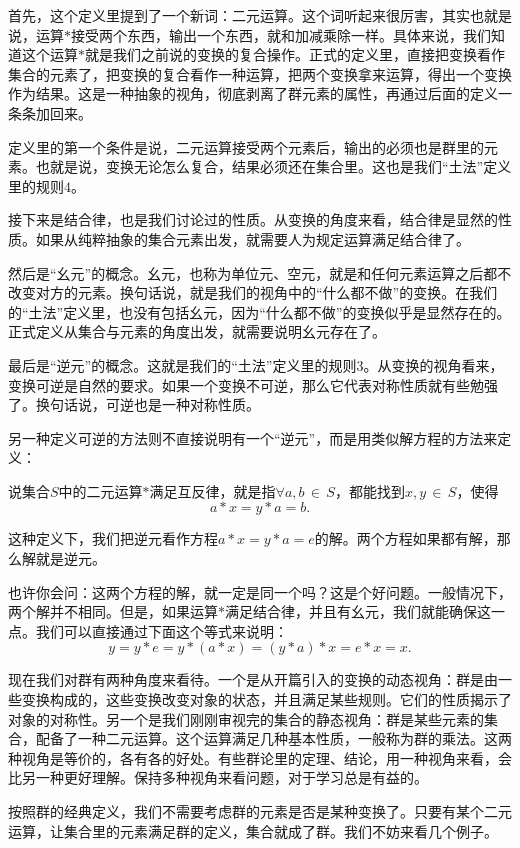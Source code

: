 \documentclass[12pt,UTF8,fontset=none]{ctexbook}
\begin{document}
首先，这个定义里提到了一个新词：二元运算。这个词听起来很厉害，其实也就是说，运算$\ast$接受两个东西，输出一个东西，就和加减乘除一样。具体来说，我们知道这个运算$\ast$就是我们之前说的变换的复合操作。正式的定义里，直接把变换看作集合的元素了，把变换的复合看作一种运算，把两个变换拿来运算，得出一个变换作为结果。这是一种抽象的视角，彻底剥离了群元素的属性，再通过后面的定义一条条加回来。

定义里的第一个条件是说，二元运算接受两个元素后，输出的必须也是群里的元素。也就是说，变换无论怎么复合，结果必须还在集合里。这也是我们“土法”定义里的规则$4$。

接下来是结合律，也是我们讨论过的性质。从变换的角度来看，结合律是显然的性质。如果从纯粹抽象的集合元素出发，就需要人为规定运算满足结合律了。

然后是“幺元”的概念。幺元，也称为单位元、空元，就是和任何元素运算之后都不改变对方的元素。换句话说，就是我们的视角中的“什么都不做”的变换。在我们的“土法”定义里，也没有包括幺元，因为“什么都不做”的变换似乎是显然存在的。正式定义从集合与元素的角度出发，就需要说明幺元存在了。

最后是“逆元”的概念。这就是我们的“土法”定义里的规则$3$。从变换的视角看来，变换可逆是自然的要求。如果一个变换不可逆，那么它代表对称性质就有些勉强了。换句话说，可逆也是一种对称性质。

另一种定义可逆的方法则不直接说明有一个“逆元”，而是用类似解方程的方法来定义：
\begin{df}
    说集合$S$中的二元运算$\ast$满足互反律，就是指$\forall a,b\,\in\,S$，都能找到$x,y\,\in\,S$，使得
    $$ a\ast x = y\ast a = b.$$
\end{df}

这种定义下，我们把逆元看作方程$a\ast x = y\ast a = e$的解。两个方程如果都有解，那么解就是逆元。

也许你会问：这两个方程的解，就一定是同一个吗？这是个好问题。一般情况下，两个解并不相同。但是，如果运算$\ast$满足结合律，并且有幺元，我们就能确保这一点。我们可以直接通过下面这个等式来说明：
$$ y = y\ast e = y\ast (a\ast x) = (y\ast a)\ast x = e\ast x = x. $$

现在我们对群有两种角度来看待。一个是从开篇引入的变换的动态视角：群是由一些变换构成的，这些变换改变对象的状态，并且满足某些规则。它们的性质揭示了对象的对称性。另一个是我们刚刚审视完的集合的静态视角：群是某些元素的集合，配备了一种二元运算。这个运算满足几种基本性质，一般称为群的乘法。这两种视角是等价的，各有各的好处。有些群论里的定理、结论，用一种视角来看，会比另一种更好理解。保持多种视角来看问题，对于学习总是有益的。

按照群的经典定义，我们不需要考虑群的元素是否是某种变换了。只要有某个二元运算，让集合里的元素满足群的定义，集合就成了群。我们不妨来看几个例子。
\end{document}
